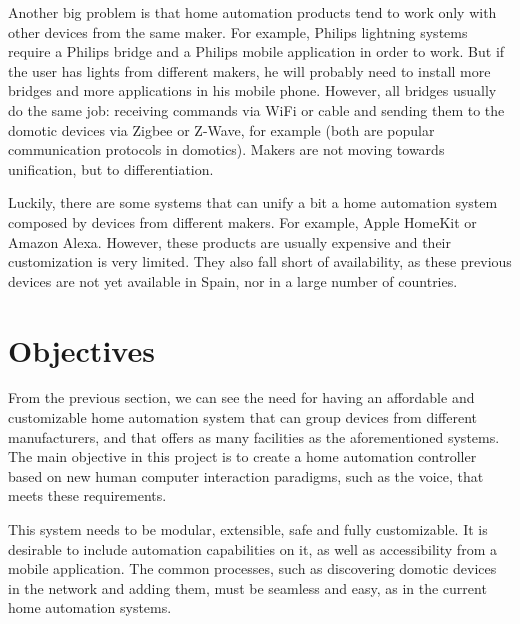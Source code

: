 Another big problem is that home automation products tend to work only with other devices from the same maker. For example, Philips
lightning systems require a Philips bridge and a Philips mobile application in order to work. But if the user has lights from different
makers, he will probably need to install more bridges and more applications in his mobile phone. However, all bridges usually do the same
job: receiving commands via WiFi or cable and sending them to the domotic devices via Zigbee or Z-Wave, for example (both are popular
communication protocols in domotics). Makers are not moving towards unification, but to differentiation.

Luckily, there are some systems that can unify a bit a home automation system composed by devices from different makers. For example,
Apple HomeKit or Amazon Alexa. However, these products are usually expensive and their customization is very limited. They also fall short
of availability, as these previous devices are not yet available in Spain, nor in a large number of countries.

\section{Objectives}
From the previous section, we can see the need for having an affordable and customizable home automation system that can group 
devices from different manufacturers, and that offers as many facilities as the aforementioned systems. The main objective in this 
project is to create a home automation controller based on new human computer interaction paradigms, such as the voice, that meets
these requirements.

This system needs to be modular, extensible, safe and fully customizable. It is desirable to include automation capabilities on it, 
as well as accessibility from a mobile application. The common processes, such as discovering domotic devices in the network and
adding them, must be seamless and easy, as in the current home automation systems.

